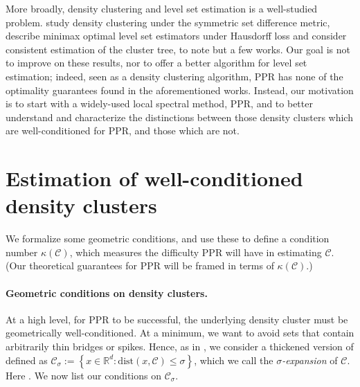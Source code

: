 \documentclass{article}
\newcommand{\set}[1]{\left\{#1\right\}}
\newcommand{\Reals}{\mathbb{R}}
\newcommand{\norm}[1]{\left\lVert#1\right\rVert}
\newcommand{\1}{\mathbf{1}}
\newcommand{\dist}{\mathrm{dist}}
\newcommand{\Cbb}{\mathbb{C}}
\newcommand{\Cset}{\mathcal{C}}
\newcommand{\Csig}{\Cset_{\sigma}}
\theoremstyle{aldenthm}
\theoremstyle{aldenrmrk}
\begin{document}
More broadly, density clustering and level set estimation is a well-studied
problem. \citet{polonik1995, rigollet2009} study density clustering under the 
symmetric set difference metric, \citet{tsybakov1997, singh2009} describe
minimax optimal level set estimators under Hausdorff loss and
\citet{hartigan1981, chaudhuri2010} consider consistent estimation of the
cluster tree, to note but a few works. Our goal is not to improve on these
results, nor to offer a better algorithm for level set estimation; indeed, seen as
a density clustering algorithm, PPR has none of the optimality guarantees 
found in the aforementioned works. Instead, our motivation is to start with a 
widely-used local spectral method, PPR, and to better understand and
characterize the distinctions between those density clusters which are
well-conditioned for PPR, and those which are not. 

\section{Estimation of well-conditioned density clusters}
\label{sec: consistent_cluster_estimation_with_ppr}

We formalize some geometric conditions, and use these to define a condition
number $\kappa(\Cset)$, which measures the difficulty PPR will have in  
estimating $\Cset$. (Our theoretical guarantees for PPR will be framed in terms 
of $\kappa(\Cset)$.)

\paragraph{Geometric conditions on density clusters.} At a high level, for PPR
to be successful, the underlying density cluster must be geometrically
well-conditioned.  At a minimum, we want to avoid sets that contain arbitrarily
thin bridges or spikes.  Hence, as in \citet{chaudhuri2010}, we consider a
thickened version of \smash{$\Cset \in \Cbb_f(\lambda)$} defined as 
$\Csig := \set{x \in \Reals^d: \dist(x,\Cset) \leq \sigma}$, which 
we call the \emph{$\sigma$-expansion} of $\Cset$. Here 
\smash{$\dist(x,\Cset) := \inf_{y \in \Cset} \norm{y - x}$}.  We now list our
conditions on $\Csig$.
\end{document}
